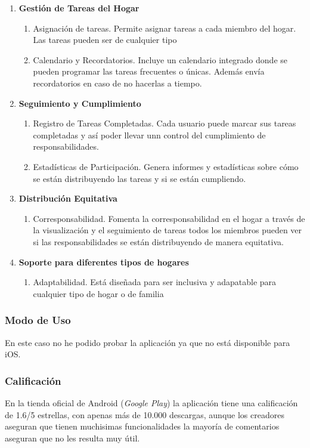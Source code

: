 \begin{enumerate}
    \item \textbf{Gestión de Tareas del Hogar}
    \begin{enumerate}
        \item Asignación de tareas. Permite asignar tareas a cada miembro del hogar. Las tareas pueden ser de cualquier tipo
        \item Calendario y Recordatorios. Incluye un calendario integrado donde se pueden programar las tareas frecuentes o únicas.
        Además envía recordatorios en caso de no hacerlas a tiempo.
    \end{enumerate}
    \item \textbf{Seguimiento y Cumplimiento}
    \begin{enumerate}
        \item Registro de Tareas Completadas. Cada usuario puede marcar sus tareas completadas y así poder llevar unn control del cumplimiento de responsabilidades.
        \item Estadísticas de Participación. Genera informes y estadísticas sobre cómo se están distribuyendo las tareas y si se están cumpliendo.
    \end{enumerate}
    \item \textbf{Distribución Equitativa}
    \begin{enumerate}
        \item Corresponsabilidad. Fomenta la corresponsabilidad en el hogar a través de la visualización 
        y el seguimiento de tareas todos los miembros pueden ver si las responsabilidades se están distribuyendo de manera equitativa.
    \end{enumerate}
    \item \textbf{Soporte para diferentes tipos de hogares}
    \begin{enumerate}
        \item Adaptabilidad. Está diseñada para ser inclusiva y adapatable para cualquier tipo de hogar o de familia
        \end{enumerate}
\end{enumerate}

\subsubsection{Modo de Uso}
\label{subsec:uso_metoca}
En este caso no he podido probar la aplicación ya que no está disponible para iOS.

\subsubsection{Calificación}
\label{subsec:calificacion_metoca}
En la tienda oficial de Android (\textit{Google Play}) la aplicación tiene una calificación de 1.6/5 estrellas,
con apenas más de 10.000 descargas, aunque los creadores aseguran que tienen muchisimas funcionalidades la mayoría de comentarios
aseguran que no les resulta muy útil.

